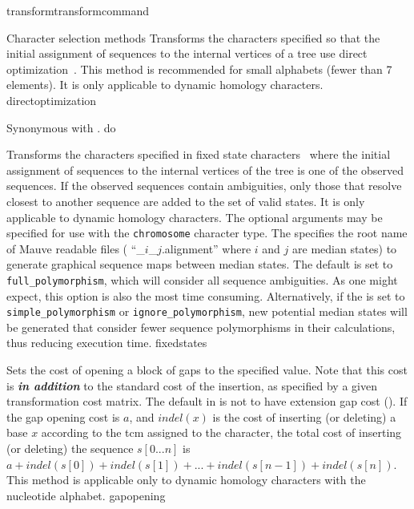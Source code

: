 \begin{command}{transform}{transformcommand}
\begin{arguments}
\begin{argumentgroup}{Character selection methods}
          {Transforms the characters specified so that the initial assignment of sequences to 
          the internal vertices of a tree use direct
          optimization~\cite{wheeler1996}. This method is recommended for small
          alphabets (fewer than 7 elements). It is only applicable to dynamic homology
          characters.}
          {directoptimization}

          {Synonymous with .}
          {do}
          
          {Transforms the characters specified in fixed state characters~\cite{wheeler1999a}
          where the initial assignment of sequences to the internal vertices of
          the tree is one of the observed sequences. If the observed sequences
          contain ambiguities, only those that resolve closest to another
          sequence are added to the set of valid states. It is only
          applicable to dynamic homology characters.  The optional arguments 
          may be specified for use with the \texttt{chromosome} character type.  
          The \poystring specifies the root name of Mauve \cite{darlingetal2004} 
          readable files ( ``\poystring\_$i$\_$j$.alignment'' where $i$ and $j$ are 
          median states) to generate graphical sequence maps between median states.  
          The default \poylident is set to \texttt{full\_polymorphism}, which will 
          consider all sequence ambiguities.  As one might expect, this option is also the most 
           time consuming. Alternatively, if the \poylident is set to \texttt{simple\_polymorphism} 
           or \texttt{ignore\_polymorphism}, new potential median states will be generated that consider fewer 
           sequence polymorphisms in their calculations, thus reducing execution time.}
          {fixedstates}
          
            {Sets the cost of opening a block of gaps to the specified value. Note that
            this cost is {\bf \emph{in addition}} to the standard cost of the insertion, as
            specified by a given transformation cost matrix.
            The default in \poy is not to have extension
            gap cost (). If the gap
            opening cost is
            $a$, and $indel(x)$ is the cost of inserting (or deleting) a
            base $x$ according to the tcm assigned to the character, the total
            cost of inserting (or deleting) the sequence $s[0...n]$ is $a +
            indel(s[0]) + indel(s[1]) + ... + indel(s[n - 1]) + indel(s[n]).$
            This method is applicable only to dynamic homology characters with
            the nucleotide alphabet.} 
            {gapopening}


\end{argumentgroup}
\end{arguments}
\end{command}
